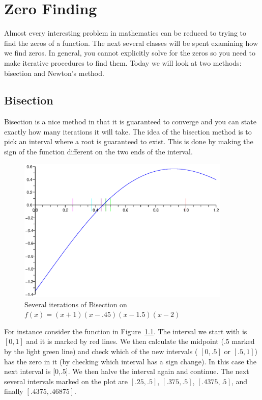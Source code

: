 \chapter{Zero Finding}\label{c-zero}

Almost every interesting problem in mathematics can be reduced to trying to find the zeros of a function.  The next several classes will be spent examining how we find zeros.  In general, you cannot explicitly solve for the zeros so you need to make iterative procedures to find them.  Today we will look at two methods: bisection and Newton's method.

\section{Bisection}
Bisection is a nice method in that it is guaranteed to converge and you can state exactly how many iterations it will take.  The idea of the bisection method is to pick an interval where a root is guaranteed to exist.  This is done by making the sign of the function different on the two ends of the interval.

\begin{figure}[h]
\begin{center}
\includegraphics[width=4in]{bisection.eps}
\end{center}
\caption{Several iterations of Bisection on $f(x)=(x+1)(x-.45)(x-1.5)(x-2)$}
\label{f-bisection}
\end{figure}

For instance consider the function in Figure~\ref{f-bisection}.  The interval we start with is $[0,1]$ and it is marked by red lines.  We then calculate the midpoint (.5 marked by the light green line) and check which of the new intervals ( $[0,.5]$ or $[.5,1]$) has the zero in it (by checking which interval has a sign change).  In this case the next interval is [0,.5].  We then halve the interval again and continue.  The next several intervals marked on the plot are $[.25,.5]$, $[.375,.5]$, $[.4375,.5]$, and finally $[.4375,.46875]$.

